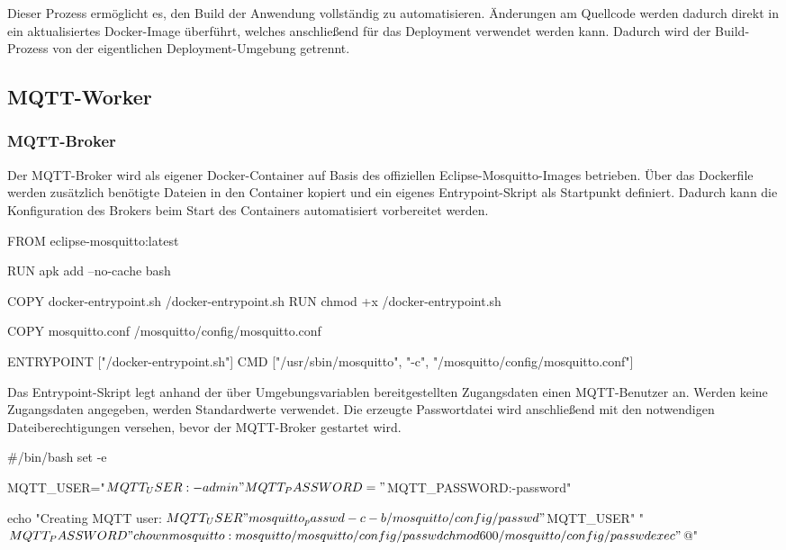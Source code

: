 Dieser Prozess ermöglicht es, den Build der Anwendung vollständig zu automatisieren. Änderungen am Quellcode werden dadurch direkt in ein aktualisiertes Docker-Image überführt, welches anschließend für das Deployment verwendet werden kann. Dadurch wird der Build-Prozess von der eigentlichen Deployment-Umgebung getrennt.

\subsection{MQTT-Worker}

\subsubsection{MQTT-Broker}

Der MQTT-Broker wird als eigener Docker-Container auf Basis des offiziellen Eclipse-Mosquitto-Images betrieben. Über das Dockerfile werden zusätzlich benötigte Dateien in den Container kopiert und ein eigenes Entrypoint-Skript als Startpunkt definiert. Dadurch kann die Konfiguration des Brokers beim Start des Containers automatisiert vorbereitet werden.

\begin{CodeBox}
FROM eclipse-mosquitto:latest

RUN apk add --no-cache bash

COPY docker-entrypoint.sh /docker-entrypoint.sh
RUN chmod +x /docker-entrypoint.sh

COPY mosquitto.conf /mosquitto/config/mosquitto.conf

ENTRYPOINT ["/docker-entrypoint.sh"]
CMD ["/usr/sbin/mosquitto", "-c", "/mosquitto/config/mosquitto.conf"]
\end{CodeBox}

Das Entrypoint-Skript legt anhand der über Umgebungsvariablen bereitgestellten Zugangsdaten einen MQTT-Benutzer an. Werden keine Zugangsdaten angegeben, werden Standardwerte verwendet. Die erzeugte Passwortdatei wird anschließend mit den notwendigen Dateiberechtigungen versehen, bevor der MQTT-Broker gestartet wird.

\begin{CodeBox}
\#\!/bin/bash
set -e

MQTT_USER="${MQTT_USER:-admin}"
MQTT_PASSWORD="${MQTT_PASSWORD:-password}"

echo "Creating MQTT user: $MQTT_USER"

mosquitto_passwd -c -b /mosquitto/config/passwd "$MQTT_USER" "$MQTT_PASSWORD"
chown mosquitto:mosquitto /mosquitto/config/passwd
chmod 600 /mosquitto/config/passwd

exec "$@" 
\end{CodeBox}

